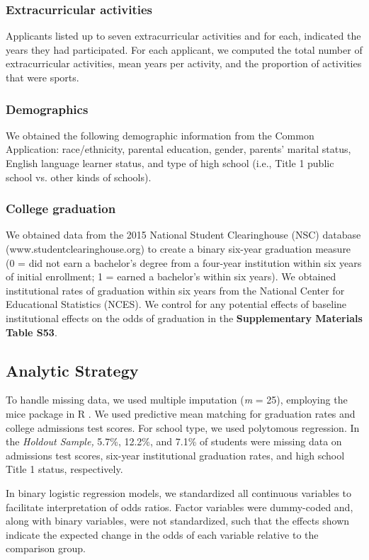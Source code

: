\documentclass[11pt]{report}
\begin{document}
\begin{mainf}
\subsubsection{Extracurricular activities}
Applicants listed up to seven extracurricular activities and for each, indicated the years they had participated. For each applicant, we computed the total number of extracurricular activities, mean years per activity, and the proportion of activities that were sports. 

\subsubsection{Demographics}
We obtained the following demographic information from the Common Application: race/ethnicity, parental education, gender, parents’ marital status, English language learner status, and type of high school (i.e., Title 1 public school vs. other kinds of schools).

\subsubsection{College graduation}
We obtained data from the 2015 National Student Clearinghouse (NSC) database (www.studentclearinghouse.org) to create a binary six-year graduation measure (0 = did not earn a bachelor’s degree from a four-year institution within six years of initial enrollment; 1 = earned a bachelor’s within six years). We obtained institutional rates of graduation within six years from the National Center for Educational Statistics (NCES). We control for any potential effects of baseline institutional effects on the odds of graduation in the \textbf{Supplementary Materials Table S53}.

\subsection{Analytic Strategy}
To handle missing data, we used multiple imputation (\textit{m} = 25), employing the mice package in R \cite{van_buuren_mice_2011}. We used predictive mean matching for graduation rates and college admissions test scores. For school type, we used polytomous regression. In the \textit{Holdout Sample,} 5.7\%, 12.2\%, and 7.1\% of students were missing data on admissions test scores, six-year institutional graduation rates, and high school Title 1 status, respectively.

In binary logistic regression models, we standardized all continuous variables to facilitate interpretation of odds ratios. Factor variables were dummy-coded and, along with binary variables, were not standardized, such that the effects shown indicate the expected change in the odds of each variable relative to the comparison group. 


\end{mainf}
\end{document}
